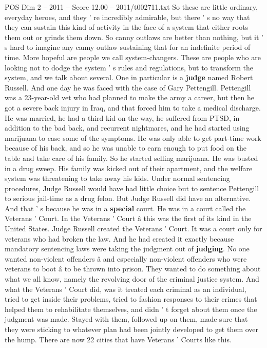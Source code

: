 \begin{textsample}{POS Dim 2 – 2011 – Score 12.00 – 2011/t002711.txt}
So these are little ordinary, everyday heroes, and they ' re incredibly admirable, but there ' s no way that they can sustain this kind of activity in the face of a system that either roots them out or grinds them down.
So canny outlaws are better than nothing, but it ' s hard to imagine any canny outlaw sustaining that for an indefinite period of time.
More hopeful are people we call system-changers.
These are people who are looking not to dodge the system ' s rules and regulations, but to transform the system, and we talk about several.
One in particular is a \textbf{judge} named Robert Russell.
And one day he was faced with the case of Gary Pettengill.
Pettengill was a 23-year-old vet who had planned to make the army a career, but then he got a severe back injury in Iraq, and that forced him to take a medical discharge.
He was married, he had a third kid on the way, he suffered from PTSD, in addition to the bad back, and recurrent nightmares, and he had started using marijuana to ease some of the symptoms.
He was only able to get part-time work because of his back, and so he was unable to earn enough to put food on the table and take care of his family.
So he started selling marijuana.
He was busted in a drug sweep.
His family was kicked out of their apartment, and the welfare system was threatening to take away his kids.
Under normal sentencing procedures, Judge Russell would have had little choice but to sentence Pettengill to serious jail-time as a drug felon.
But Judge Russell did have an alternative.
And that ' s because he was in a \textbf{special} court.
He was in a court called the Veterans ' Court.
In the Veterans ' Court â this was the first of its kind in the United States.
Judge Russell created the Veterans ' Court.
It was a court only for veterans who had broken the law.
And he had created it exactly because mandatory sentencing laws were taking the judgment out of \textbf{judging}.
No one wanted non-violent offenders â and especially non-violent offenders who were veterans to boot â to be thrown into prison.
They wanted to do something about what we all know, namely the revolving door of the criminal justice system.
And what the Veterans ' Court did, was it treated each criminal as an individual, tried to get inside their problems, tried to fashion responses to their crimes that helped them to rehabilitate themselves, and didn ' t forget about them once the judgment was made.
Stayed with them, followed up on them, made sure that they were sticking to whatever plan had been jointly developed to get them over the hump.
There are now 22 cities that have Veterans ' Courts like this.

\end{textsample}
